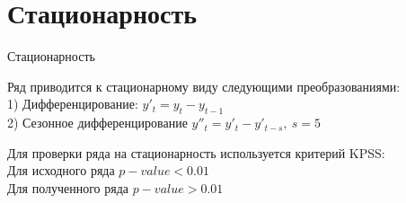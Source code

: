 \documentclass[10pt,pdf,hyperref={unicode}]{beamer}
\begin{document}
\section{Стационарность}
\begin{frame}{Стационарность}

Ряд приводится к стационарному виду следующими преобразованиями: \\
1) Дифференцирование: $y'_{t} = y_{t} - y_{t-1}$ \\ 
2) Сезонное дифференцирование $y''_{t} = y'_{t} - y'_{t-s}, \ s=5$ \\

\begin{figure}[h!t]\center
{}
\end{figure}

Для проверки ряда на стационарность используется критерий KPSS: \\
Для исходного ряда $p-value < 0.01$ \\
Для полученного ряда $p-value > 0.01$ 

\end{frame}

\end{document}
